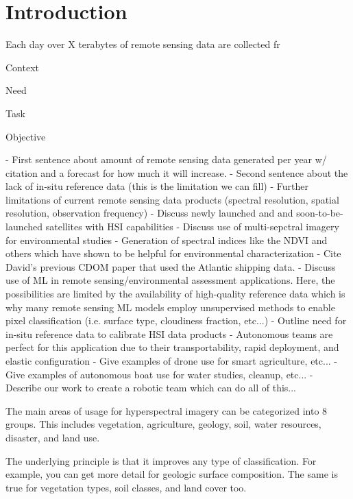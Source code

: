 \documentclass[journal,article,submit,pdftex,moreauthors]{Definitions/mdpi}
\begin{document}
\section{Introduction}

Each day over X terabytes of remote sensing data are collected fr


Context

Need

Task 

Objective


- First sentence about amount of remote sensing data generated per year w/ citation and a forecast for how much it will increase. 
- Second sentence about the lack of in-situ reference data (this is the limitation we can fill) 
- Further limitations of current remote sensing data products (spectral resolution, spatial resolution, observation frequency)
- Discuss newly launched and and soon-to-be-launched satellites with HSI capabilities
- Discuss use of multi-sepctral imagery for environmental studies
    - Generation of spectral indices like the NDVI and others which have shown to be helpful for environmental characterization
    - Cite David's previous CDOM paper that used the Atlantic shipping data.
- Discuss use of ML in remote sensing/environmental assessment applications. Here, the possibilities are limited by the availability of high-quality reference data which is why many remote sensing ML models employ unsupervised methods to enable pixel classification (i.e. surface type, cloudiness fraction, etc...)
- Outline need for in-situ reference data to calibrate HSI data products
- Autonomous teams are perfect for this application due to their transportability, rapid deployment, and elastic configuration
- Give examples of drone use for smart agriculture, etc... 
- Give examples of autonomous boat use for water studies, cleanup, etc... 
- Describe our work to create a robotic team which can do all of this... 


The main areas of usage for hyperspectral imagery can be categorized into 8 groups. This includes vegetation, agriculture, geology, soil, water resources, disaster, and land use.

The underlying principle is that it improves any type of classification. For example, you can get more detail for geologic surface composition. The same is true for vegetation types, soil classes, and land cover too.
\end{document}
